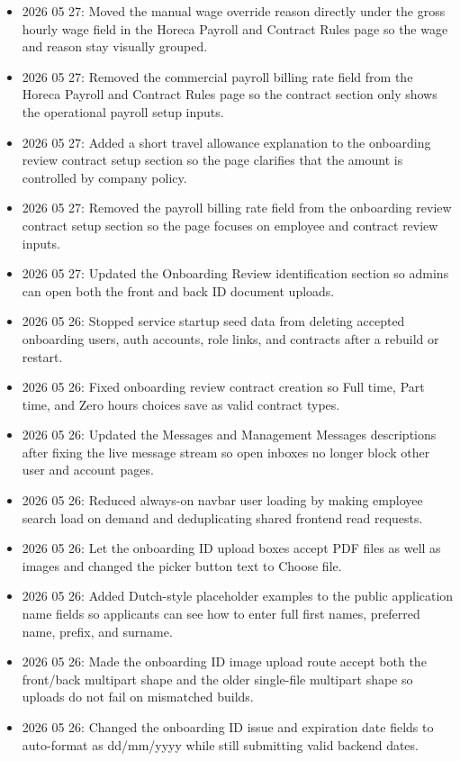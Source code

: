 \documentclass[11pt]{article}
\begin{document}
\begin{itemize}
    \item 2026 05 27: Moved the manual wage override reason directly under the gross hourly wage field in the Horeca Payroll and Contract Rules page so the wage and reason stay visually grouped.
    \item 2026 05 27: Removed the commercial payroll billing rate field from the Horeca Payroll and Contract Rules page so the contract section only shows the operational payroll setup inputs.
    \item 2026 05 27: Added a short travel allowance explanation to the onboarding review contract setup section so the page clarifies that the amount is controlled by company policy.
    \item 2026 05 27: Removed the payroll billing rate field from the onboarding review contract setup section so the page focuses on employee and contract review inputs.
    \item 2026 05 27: Updated the Onboarding Review identification section so admins can open both the front and back ID document uploads.
    \item 2026 05 26: Stopped service startup seed data from deleting accepted onboarding users, auth accounts, role links, and contracts after a rebuild or restart.
    \item 2026 05 26: Fixed onboarding review contract creation so Full time, Part time, and Zero hours choices save as valid contract types.
    \item 2026 05 26: Updated the Messages and Management Messages descriptions after fixing the live message stream so open inboxes no longer block other user and account pages.
    \item 2026 05 26: Reduced always-on navbar user loading by making employee search load on demand and deduplicating shared frontend read requests.
    \item 2026 05 26: Let the onboarding ID upload boxes accept PDF files as well as images and changed the picker button text to Choose file.
    \item 2026 05 26: Added Dutch-style placeholder examples to the public application name fields so applicants can see how to enter full first names, preferred name, prefix, and surname.
    \item 2026 05 26: Made the onboarding ID image upload route accept both the front/back multipart shape and the older single-file multipart shape so uploads do not fail on mismatched builds.
    \item 2026 05 26: Changed the onboarding ID issue and expiration date fields to auto-format as dd/mm/yyyy while still submitting valid backend dates.

\end{itemize}
\end{document}
